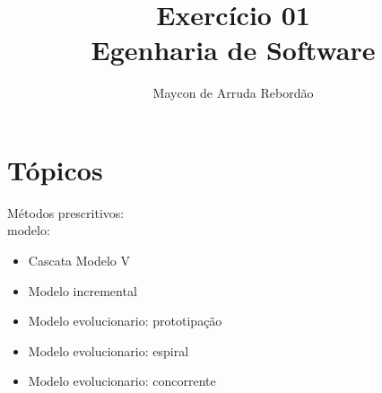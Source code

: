 \documentclass[12pt]{article}
\title{Exercício 01 \\Egenharia de Software}
\author{Maycon de Arruda Rebordão}
\begin{document}
 

\maketitle

\section{Tópicos}
Métodos prescritivos:\\
modelo:
\begin{itemize}
  \item Cascata Modelo V
  \item Modelo incremental
  \item Modelo evolucionario: prototipação
  \item Modelo evolucionario: espiral
  \item Modelo evolucionario: concorrente

\end{itemize}
\end{document}
